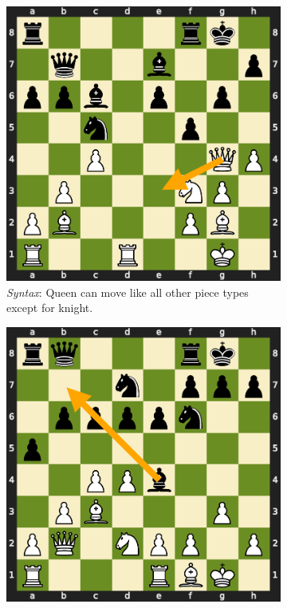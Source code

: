\begin{figure}[t]
\begin{subfigure}{0.3\textwidth}
   \includegraphics[width=\linewidth]{figures/board_syntax.pdf}
   \caption{\emph{Syntax}: Queen can move like all other piece types except for knight.} \label{fig:error_syntax}
\end{subfigure}
\hspace*{\fill}
\begin{subfigure}{0.3\textwidth}
   \includegraphics[width=\linewidth]{figures/board_path.pdf}

\end{subfigure}
\end{figure}
